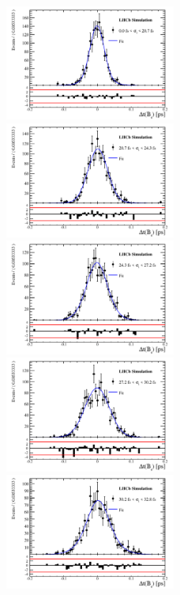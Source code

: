 \begin{figure}[h]
\includegraphics[height=!,width=0.5\textwidth]{figs/Resolution/SignalMC_bin_1.pdf}
\includegraphics[height=!,width=0.5\textwidth]{figs/Resolution/SignalMC_bin_2.pdf}
\includegraphics[height=!,width=0.5\textwidth]{figs/Resolution/SignalMC_bin_3.pdf}
\includegraphics[height=!,width=0.5\textwidth]{figs/Resolution/SignalMC_bin_4.pdf}
\includegraphics[height=!,width=0.5\textwidth]{figs/Resolution/SignalMC_bin_5.pdf}

\end{figure}
